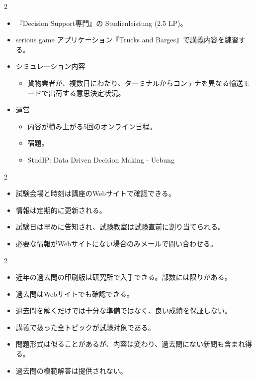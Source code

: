 \clearpage
{}
\begin{multicols}{2}\scriptsize\raggedcolumns
{}
\begin{itemize}
\item 『Decision Support専門』の Studienleistung (2.5 LP)。
\item serious game アプリケーション『Trucks and Barges』で講義内容を練習する。
\item シミュレーション内容
\begin{itemize}
\item 貨物業者が、複数日にわたり、ターミナルからコンテナを異なる輸送モードで出荷する意思決定状況。
\end{itemize}
\item 運営
\begin{itemize}
\item 内容が積み上がる5回のオンライン日程。
\item 宿題。
\item StudIP: Data Driven Decision Making - Uebung
\end{itemize}
\end{itemize}
\end{multicols}

\clearpage
{}
\begin{multicols}{2}\scriptsize\raggedcolumns
{}
\begin{itemize}
\item 試験会場と時刻は講座のWebサイトで確認できる。
\item 情報は定期的に更新される。
\item 試験日は早めに告知され、試験教室は試験直前に割り当てられる。
\item 必要な情報がWebサイトにない場合のみメールで問い合わせる。
\end{itemize}
\end{multicols}

\clearpage
{}
\begin{multicols}{2}\scriptsize\raggedcolumns
{}
\begin{itemize}
\item 近年の過去問の印刷版は研究所で入手できる。部数には限りがある。
\item 過去問はWebサイトでも確認できる。
\item 過去問を解くだけでは十分な準備ではなく、良い成績を保証しない。
\item 講義で扱った全トピックが試験対象である。
\item 問題形式は似ることがあるが、内容は変わり、過去問にない新問も含まれ得る。
\item 過去問の模範解答は提供されない。
\end{itemize}
\end{multicols}

